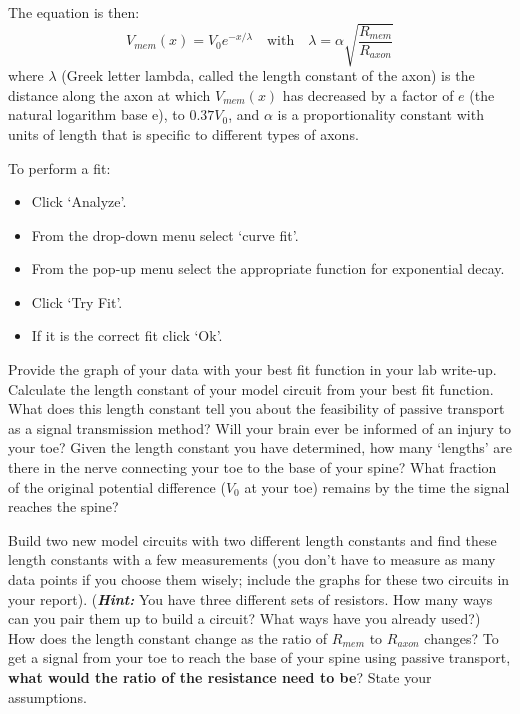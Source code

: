 The equation is then:
\[ V_{mem}(x) = V_{0} e^{-x/\lambda} \quad \textrm{with} \quad \lambda =\alpha \sqrt{\frac{R_{mem}}{R_{axon}}}  \]
where $\lambda$ (Greek letter lambda, called the length constant of the axon) is the distance along the axon at which $V_{mem}(x)$ has decreased by a factor of $e$ (the natural logarithm base e), to $0.37 V_{0}$, and $\alpha$ is a proportionality constant with units of length that is specific to different types of axons.
\par 
To perform a fit:
\begin{itemize}
\itemsep-0.2em
\item Click `Analyze'.
\item From the drop-down menu select `curve fit'.
\item From the pop-up menu select the appropriate function for exponential decay.
\item Click `Try Fit'.
\item If it is the correct fit click `Ok'.
\end{itemize}
Provide the graph of your data with your best fit function in your lab write-up.
Calculate the length constant of your model circuit from your best fit function.
What does this length constant tell you about the feasibility of passive transport as a signal transmission method?
Will your brain ever be informed of an injury to your toe?
Given the length constant you have determined, how many `lengths' are there in the nerve connecting your toe to the base of your spine?
What fraction of the original potential difference ($V_{0}$ at your toe) remains by the time the signal reaches the spine?
\par 
Build two new model circuits with two different length constants and find these length constants with a few measurements (you don't have to measure as many data points if you choose them wisely; include the graphs for these two circuits in your report).
(\textbf{\emph{Hint:}} You have three different sets of resistors. 
How many ways can you pair them up to build a circuit? 
What ways have you already used?)
How does the length constant change as the ratio of $R_{mem}$ to $R_{axon}$ changes?
To get a signal from your toe to reach the base of your spine using passive transport, \textbf{what would the ratio of the resistance need to be}?
State your assumptions.

\newpage

